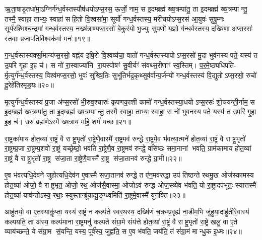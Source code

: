 {\anuvakamend[{प्रा॒जा॒प॒त्याः सोऽष्टाद॑श च॥६॥}]}

ऋ॒ता॒षाडृ॒तधा॑मा॒ऽग्निर्ग॑न्ध॒र्वस्तस्यौष॑धयोऽप्स॒रस॒ ऊर्जो॒ नाम॒ स इ॒दम्ब्रह्म॑ ख्ष॒त्रम्पा॑तु॒ ता इ॒दम्ब्रह्म॑ ख्ष॒त्रम्पान्तु॒ तस्मै॒ स्वाहा॒ ताभ्यः॒ स्वाहा॑ सहि॒तो वि॒श्वसा॑मा॒ सूर्यो॑ गन्ध॒र्वस्तस्य॒ मरी॑चयोऽप्स॒रस॑ आ॒युवः॑ सुषु॒म्नः सूर्य॑रश्मिश्च॒न्द्रमा॑ गन्ध॒र्वस्तस्य॒ नख्ष॑त्राण्यप्स॒रसो॑ बे॒कुर॑यो भु॒ज्युः सु॑प॒र्णो य॒ज्ञो ग॑न्ध॒र्वस्तस्य॒ दख्षि॑णा अप्स॒रसः॑ स्त॒वाः प्र॒जाप॑तिर्वि॒श्वक॑र्मा॒ मनः॑॥१९॥

ग॒न्ध॒र्वस्तस्य॑र्क्सा॒मान्य॑प्स॒रसो॒ वह्न॑य इषि॒रो वि॒श्वव्य॑चा॒ वातो॑ गन्ध॒र्वस्तस्यापोऽप्स॒रसो॑ मु॒दा भुव॑नस्य पते॒ यस्य॑ त उ॒परि॑ गृ॒हा इ॒ह च॑। स नो॑ रा॒स्वाज्या॑नि रा॒यस्पोषꣳ॑ सु॒वीर्यꣳ॑ संवथ्स॒रीणाꣳ॑ स्व॒स्तिम्। प॒र॒मे॒ष्ठ्यधि॑पति- र्मृ॒त्युर्ग॑न्ध॒र्वस्तस्य॒ विश्व॑मप्स॒रसो॒ भुवः॑ सुख्षि॒तिः सुभू॑तिर्भद्र॒कृथ्सुव॑र्वान्प॒र्जन्यो॑ गन्ध॒र्वस्तस्य॑ वि॒द्युतोऽप्स॒रसो॒ रुचो॑ दू॒रेहे॑तिरमृड॒यः॥२०॥

मृ॒त्युर्ग॑न्ध॒र्वस्तस्य॑ प्र॒जा अ॑प्स॒रसो॑ भी॒रुव॒श्चारुः॑ कृपणका॒शी कामो॑ गन्ध॒र्वस्तस्या॒धयोऽप्स॒रसः॑ शो॒चय॑न्ती॒र्नाम॒ स इ॒दम्ब्रह्म॑ ख्ष॒त्रम्पा॑तु॒ ता इ॒दम्ब्रह्म॑ ख्ष॒त्रम्पान्तु॒ तस्मै॒ स्वाहा॒ ताभ्यः॒ स्वाहा॒ स नो॑ भुवनस्य पते॒ यस्य॑ त उ॒परि॑ गृ॒हा इ॒ह च॑। उ॒रु ब्रह्म॑णे॒ऽस्मै ख्ष॒त्राय॒ महि॒ शर्म॑ यच्छ॥२१॥

{\anuvakamend[{मनो॑ऽमृड॒यष्षट्च॑त्वारिशच्च॥७॥}]}

रा॒ष्ट्रका॑माय होत॒व्या॑ रा॒ष्ट्रं वै राष्ट्र॒भृतो॑ रा॒ष्ट्रेणै॒वास्मै॑ रा॒ष्ट्रमव॑ रुन्द्धे रा॒ष्ट्रमे॒व भ॑वत्या॒त्मने॑ होत॒व्या॑ रा॒ष्ट्रं वै राष्ट्र॒भृतो॑ रा॒ष्ट्रम्प्र॒जा रा॒ष्ट्रम्प॒शवो॑ रा॒ष्ट्रं यच्छ्रेष्ठो॒ भव॑ति रा॒ष्ट्रेणै॒व रा॒ष्ट्रमव॑ रुन्द्धे॒ वसि॑ष्ठः समा॒नानां भवति॒ ग्राम॑कामाय होत॒व्या॑ रा॒ष्ट्रं वै राष्ट्र॒भृतो॑ रा॒ष्ट्र स॑जा॒ता रा॒ष्ट्रेणै॒वास्मै॑ रा॒ष्ट्र स॑जा॒तानव॑ रुन्द्धे ग्रा॒मी॥२२॥

ए॒व भ॑वत्यधि॒देव॑ने जुहोत्यधि॒देव॑न ए॒वास्मै॑ सजा॒तानव॑ रुन्द्धे॒ त ए॑न॒मव॑रुद्धा॒ उप॑ तिष्ठन्ते रथमु॒ख ओज॑स्कामस्य होत॒व्या॑ ओजो॒ वै राष्ट्र॒भृत॒ ओजो॒ रथ॒ ओज॑सै॒वास्मा॒ ओजोऽव॑ रुन्द्ध ओज॒स्व्ये॑व भ॑वति॒ यो रा॒ष्ट्रादप॑भूतः॒ स्यात्तस्मै॑ होत॒व्या॑ याव॑न्तोऽस्य॒ रथाः॒ स्युस्तान्ब्रू॑याद्यु॒ङ्ग्ध्वमिति॑ रा॒ष्ट्रमे॒वास्मै॑ युनक्ति॥२३॥

आहु॑तयो॒ वा ए॒तस्याकॢ॑प्ता॒ यस्य॑ रा॒ष्ट्रं न कल्प॑ते स्वर॒थस्य॒ दख्षि॑णं च॒क्रम्प्र॒वृह्य॑ ना॒डीम॒भि जु॑हुया॒दाहु॑तीरे॒वास्य॑ कल्पयति॒ ता अ॑स्य॒ कल्प॑माना रा॒ष्ट्रमनु॑ कल्पते संग्रा॒मे संय॑त्ते होत॒व्या॑ रा॒ष्ट्रं वै राष्ट्र॒भृतो॑ रा॒ष्ट्रे खलु॒ वा ए॒ते व्याय॑च्छन्ते॒ ये सं॑ग्रा॒म सं॒यन्ति॒ यस्य॒ पूर्व॑स्य॒ जुह्व॑ति॒ स ए॒व भ॑वति॒ जय॑ति॒ तं सं॑ग्रा॒मं मान्धु॒क इ॒ध्मः॥२४॥

